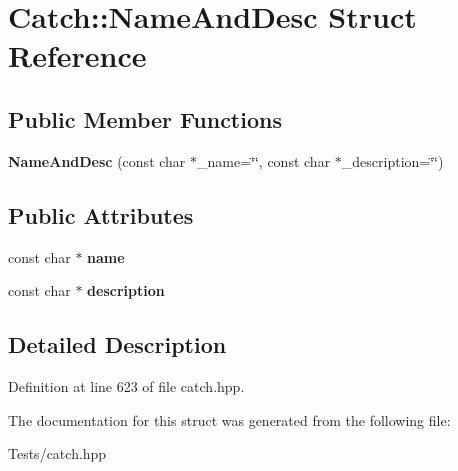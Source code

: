 \hypertarget{struct_catch_1_1_name_and_desc}{}\section{Catch\+:\+:Name\+And\+Desc Struct Reference}
\label{struct_catch_1_1_name_and_desc}
\subsection*{Public Member Functions}
\begin{DoxyCompactItemize}
\item 
\mbox{\label{struct_catch_1_1_name_and_desc_a189ceb9942fb5f6635140d6a09fc843a}} 
{\bfseries Name\+And\+Desc} (const char $\ast$\+\_\+name=\char`\"{}\char`\"{}, const char $\ast$\+\_\+description=\char`\"{}\char`\"{})
\end{DoxyCompactItemize}
\subsection*{Public Attributes}
\begin{DoxyCompactItemize}
\item 
\mbox{\label{struct_catch_1_1_name_and_desc_a374b4ed8be3cf98be20ebde5273bde51}} 
const char $\ast$ {\bfseries name}
\item 
\mbox{\label{struct_catch_1_1_name_and_desc_a3463a23ff65ce494fc380452b57b7970}} 
const char $\ast$ {\bfseries description}
\end{DoxyCompactItemize}


\subsection{Detailed Description}


Definition at line 623 of file catch.\+hpp.



The documentation for this struct was generated from the following file\+:\begin{DoxyCompactItemize}
\item 
Tests/catch.\+hpp\end{DoxyCompactItemize}
